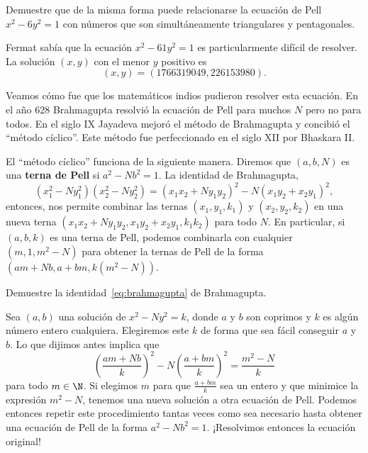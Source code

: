 \begin{exercise}
Demuestre que de la misma forma puede relacionarse la ecuación de Pell
$x^2-6y^2=1$ con números que son simultáneamente triangulares y pentagonales.
\end{exercise}

Fermat sabía que la ecuación $x^2-61y^2=1$ es particularmente difícil de
resolver. La solución $(x,y)$ con el menor $y$ positivo es
\[
(x,y)=(1766319049, 226153980).
\]

Veamos cómo fue que los matemáticos indios pudieron resolver esta ecuación.  En
el año 628 Brahmagupta resolvió la ecuación de Pell para muchos $N$  pero no
para todos. En el siglo IX Jayadeva mejoró el método de Brahmagupta y concibió
el ``método cíclico''. Este método fue perfeccionado en el siglo XII por
Bhaskara II. 

El ``método cíclico'' funciona de la siguiente manera. 
Diremos que $(a,b,N)$ es una \textbf{terna de Pell}
si $a^2-Nb^2=1$. La identidad de Brahmagupta, 
\begin{equation}
	\label{eq:brahmagupta}
	(x_1^2-Ny_1^2)(x_2^2-Ny_2^2)=(x_1x_2+Ny_1y_2)^2-N(x_1y_2+x_2y_1)^2,
\end{equation}
entonces, nos permite combinar las ternas $(x_1,y_1,k_1)$ y $(x_2,y_2,k_2)$ en
una nueva terna $(x_1x_2+Ny_1y_2,x_1y_2+x_2y_1,k_1k_2)$ para todo $N$. En
particular, si $(a,b,k)$ es una terna de Pell, podemos combinarla con cualquier
$(m,1,m^2-N)$ para obtener la ternas de Pell de la forma
$(am+Nb,a+bm,k(m^2-N))$.

\begin{exercise}
	Demuestre la identidad~\ref{eq:brahmagupta} de Brahmagupta.
\end{exercise}

Sea $(a,b)$ una solución de $x^2-Ny^2=k$, donde $a$ y $b$ son coprimos y $k$ es
algún número entero cualquiera. Elegiremos este $k$ de forma que sea fácil
conseguir $a$ y $b$. Lo que dijimos antes implica que
\begin{equation}
	\label{eq:Pell_inductive}
	\left(\frac{am+Nb}{k}\right)^2-N\left(\frac{a+bm}{k}\right)^2=\frac{m^2-N}{k}
\end{equation}
para todo $m\in\N$. 
Si elegimos $m$ para que $\frac{a+bm}{k}$ sea un entero y que minimice la
expresión $m^2-N$, tenemos una nueva solución a otra ecuación de Pell. Podemos
entonces repetir este procedimiento tantas veces como sea necesario hasta
obtener una ecuación de Pell de la forma $a^2-Nb^2=1$. ¡Resolvimos entonces la ecuación original!

